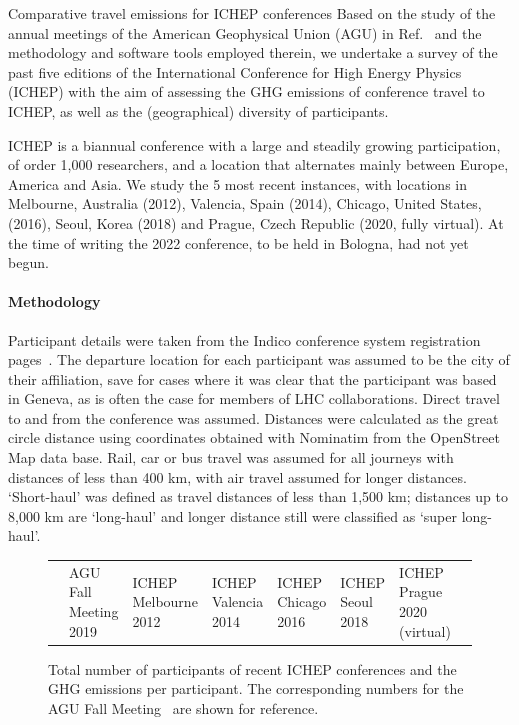 \documentclass[../SustainableHEP.tex]{subfiles}
\begin{document}
\begin{casestudy}{Comparative travel emissions for ICHEP conferences}%
Based on the study of the annual meetings of the American Geophysical Union (AGU) in Ref.~\cite{RefAGU} and the methodology and software tools employed therein, we undertake a survey of the past five editions of the International Conference for High Energy Physics (ICHEP) with the aim of assessing the GHG emissions of conference travel to ICHEP, as well as the (geographical) diversity of participants.

ICHEP is a biannual conference with a large and steadily growing participation, of order 1,000 researchers, and a location that alternates mainly between Europe, America and Asia.  We study the 5 most recent instances, with locations in Melbourne, Australia (2012), Valencia, Spain (2014), Chicago, United States, (2016), Seoul, Korea (2018) and Prague, Czech Republic (2020, fully virtual).  At the time of writing the 2022 conference, to be held in Bologna, had not yet begun.

\paragraph{Methodology}

Participant details were taken from the Indico conference system registration pages~\cite{indico}. The departure location for each participant was assumed to be the city of their affiliation, save for cases where it was clear that the participant was based in Geneva, as is often the case for members of LHC collaborations. Direct travel to and from the conference was assumed.  Distances were calculated as the great circle distance using coordinates obtained with Nominatim from the OpenStreet Map data base. Rail, car or bus travel was assumed for all journeys with distances of less than 400 km, with air travel assumed for longer distances.  `Short-haul' was defined as travel distances of less than 1,500 km; distances up to 8,000 km are `long-haul' and longer distance still were classified as `super long-haul'.

\begin{figure}
{\scriptsize
{}
\captionsetup{type=table}
\caption[Total number of participants of recent ICHEP conferences and the GHG emissions per participant]{Total number of participants of recent ICHEP conferences and the GHG emissions per participant.
The corresponding numbers for the AGU Fall Meeting~\cite{RefAGU} are shown for reference.}
\label{tab:icheppart}
\begin{tabular}{@{}p{2.3cm}>{\baselineskip=10pt}p{1.8cm}>{\baselineskip=10pt}p{1.5cm}>{\baselineskip=10pt}p{1.5cm}>{\baselineskip=10pt}p{1.5cm}>{\baselineskip=10pt}p{1.4cm}>{\baselineskip=10pt}p{1.7cm}c@{}}\toprule
&AGU Fall Meeting 2019 & 
ICHEP Melbourne 2012 & 
ICHEP Valencia 2014 &
ICHEP Chicago 2016 & 
ICHEP Seoul 2018 &         
ICHEP Prague 2020 (virtual) \\ \cmidrule{2-7}
    

\end{tabular}}
\end{figure}
\end{casestudy}
\end{document}
